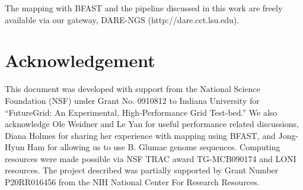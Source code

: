 \documentclass{cpeauth}
\begin{document}
The mapping with BFAST and the pipeline discussed in this work are freely available via our gateway, DARE-NGS (http://dare.cct.lsu.edu).


\section*{Acknowledgement}

This document was developed with support from the National Science
Foundation (NSF) under Grant No.  0910812 to Indiana University for
``FutureGrid: An Experimental, High-Performance Grid Test-bed.''  We
also acknowledge Ole Weidner and Le Yan for useful performance related
discussions, Diana Holmes for sharing her experience with mapping
using BFAST, and Jong-Hyun Ham for allowing us to use B. Glumae genome
sequences.  Computing resources were made possible via NSF TRAC award
TG-MCB090174 and LONI resources.  The project described was partially
supported by Grant Number P20RR016456 from the NIH National Center For
Research Resources.

 

\end{document}
